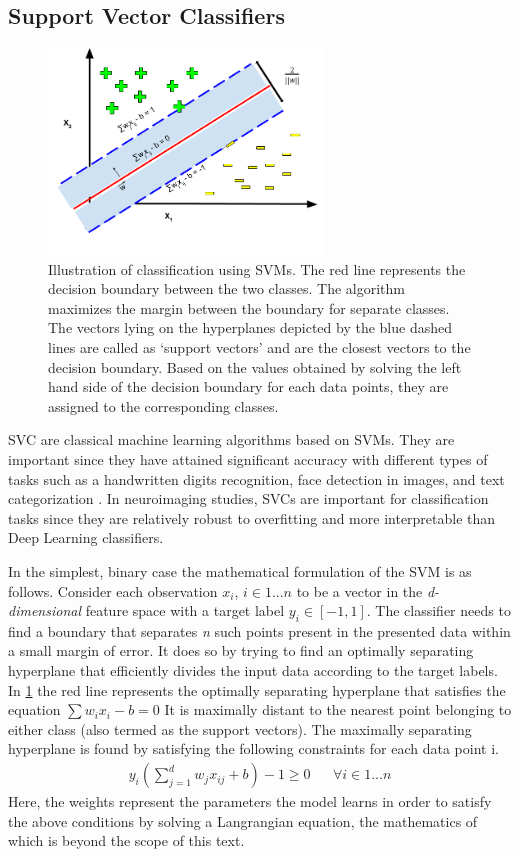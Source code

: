 \documentclass[msthesis.tex]{subfiles}
\begin{document}
\subsection{Support Vector Classifiers}
\begin{figure}[h]
    \centering
    \includegraphics[width=0.65\textwidth]{images/SVM.png}
    \caption{Illustration of classification using \gls{SVM}s. The red line represents the decision boundary between the two classes. The algorithm maximizes the margin between the boundary for separate classes. The vectors lying on the hyperplanes depicted by the blue dashed lines are called as `support vectors' and are the closest vectors to the decision boundary. Based on the values obtained by solving the left hand side of the decision boundary for each data points, they are assigned to the corresponding classes.}
    \label{fig:svm}
\end{figure}
\gls{SVC} are classical machine learning algorithms based on \gls{SVM}s. They are important since they have attained significant accuracy with different types of tasks such as a handwritten digits recognition, face detection in images, and text categorization \citep{burges1998a}. In neuroimaging studies, SVCs are important for classification tasks since they are relatively robust to overfitting and more interpretable than Deep Learning classifiers.

In the simplest, binary case the mathematical formulation of the SVM is as follows. Consider each observation \textbf{$x_i$}, $i\in {1...n}$ to be a vector in the \textit{d-dimensional} feature space with a target label  $y_i\in {[-1,1]}$. The classifier needs to find a boundary that separates \textit{n} such points present in the presented data within a small margin of error. It does so by trying to find an optimally separating hyperplane that efficiently divides the input data according to the target labels. In \cref{fig:svm} the red line represents the optimally separating hyperplane that satisfies the equation
$ \sum w_i x_i - b = 0$
 It is maximally distant to the nearest point belonging to either class (also termed as the support vectors). The maximally separating hyperplane is found by satisfying the following constraints for each data point i. 
\begin{align}
    y_i(\sum_{j=1}^{d} w_{j} x_{ij}  + b)  - 1\geq 0 && \forall i \in {1...n}
\end{align}
Here, the weights represent the parameters the model learns in order to satisfy the above conditions by solving a Langrangian equation, the mathematics of which is beyond the scope of this text. 
\end{document}
